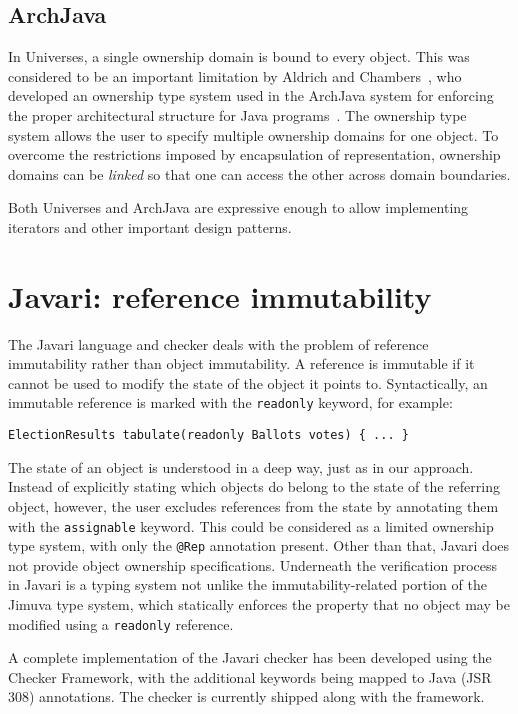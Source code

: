 \documentclass{pracamgr}
\theoremstyle{break}
\theoremstyle{break}
\theoremstyle{break}
\begin{document}
\subsection{ArchJava}

In Universes, a single ownership domain is bound to every object. This
was considered to be an important limitation by Aldrich and
Chambers~\cite{domains}, who developed an ownership type system used
in the ArchJava system for enforcing the proper architectural
structure for Java programs~\cite{archjava}. The ownership type system
allows the user to specify multiple ownership domains for one
object. To overcome the restrictions imposed by encapsulation of
representation, ownership domains can be \emph{linked} so that one can
access the other across domain boundaries. 

Both Universes and ArchJava are expressive enough to allow
implementing iterators and other important design patterns.

\section{Javari: reference immutability}

The Javari language and checker \cite{javari} deals with the problem
of reference immutability rather than object immutability. A reference
is immutable if it cannot be used to modify the state of the object it
points to. Syntactically, an immutable reference is marked with the
\texttt{readonly} keyword, for example:

\begin{center}
  \texttt{ElectionResults tabulate(readonly Ballots votes) \{ ... \}}
\end{center}

The state of an object is understood in a deep way, just as in our
approach. Instead of explicitly stating which objects do belong to the
state of the referring object, however, the user excludes references
from the state by annotating them with the \texttt{assignable}
keyword. This could be considered as a limited ownership type system,
with only the \texttt{@Rep} annotation present. Other than that,
Javari does not provide object ownership specifications. Underneath
the verification process in Javari is a typing system not unlike the
immutability-related portion of the Jimuva type system, which
statically enforces the property that no object may be modified using
a \texttt{readonly} reference.

A complete implementation of the Javari checker has been developed
using the Checker Framework, with the additional keywords being
mapped to Java (JSR 308) annotations. The checker is currently shipped
along with the framework.
\end{document}
